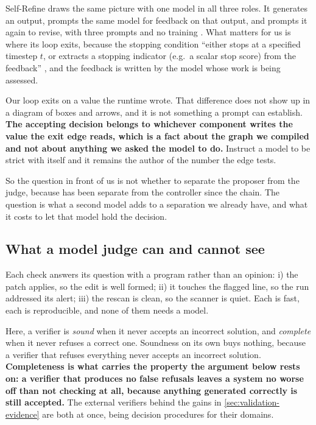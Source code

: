 Self-Refine draws the same picture with one model in all three roles. It generates an output,
prompts the same model for feedback on that output, and prompts it again to revise, with three
prompts and no training \citep[\S2]{madaan2023selfrefine}. What matters for us is where its loop
exits, because the stopping condition ``either stops at a specified timestep $t$, or extracts a
stopping indicator (e.g.\ a scalar stop score) from the feedback''
\citep[\S2]{madaan2023selfrefine}, and the feedback is written by the model whose work is being
assessed.

Our loop exits on a value the runtime wrote. That difference does not show up in a diagram of boxes
and arrows, and it is not something a prompt can establish. \textbf{The accepting decision belongs
to whichever component writes the value the exit edge reads, which is a fact about the graph we
compiled and not about anything we asked the model to do.} Instruct a model to be strict with itself
and it remains the author of the number the edge tests.

So the question in front of us is not whether to separate the proposer from the judge, because
 has been separate from the controller since the chain. The question is what a
second model adds to a separation we already have, and what it costs to let that model hold the
decision.

\subsection{What a model judge can and cannot see}
\label{sec:validation-judge}

Each check answers its question with a program rather than an opinion: i) the patch applies, so the
edit is well formed; ii) it touches the flagged line, so the run addressed its alert; iii) the
rescan is clean, so the scanner is quiet. Each is fast, each is reproducible,
and none of them needs a model.

Here, a verifier is \emph{sound} when it never accepts an incorrect solution, and \emph{complete}
when it never refuses a correct one. Soundness on its own buys nothing, because a verifier that
refuses everything never accepts an incorrect solution. \textbf{Completeness is what carries the
property the argument below rests on: a verifier that produces no false refusals leaves a system no
worse off than not checking at all, because anything generated correctly is still accepted.} The
external verifiers behind the gains in \cref{sec:validation-evidence} are both at once, being
decision procedures for their domains.

